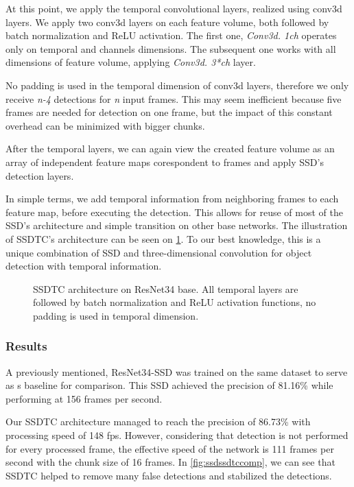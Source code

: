 At this point, we apply the temporal convolutional layers, realized using conv3d layers. We apply two conv3d layers on each feature volume, both followed by batch normalization and ReLU activation.  The first one, \textit{Conv3d. 1\x ch} operates only on temporal and channels dimensions.  The subsequent one works with all dimensions of feature volume, applying \textit{Conv3d. 3*ch} layer. 

No padding is used in the temporal dimension of conv3d layers, therefore we only receive \textit{n-4} detections for \textit{n} input frames. This may seem inefficient because five frames are needed for detection on one frame, but the impact of this constant overhead can be minimized with bigger chunks. 

After the temporal layers, we can again view the created feature volume as an array of independent feature maps corespondent to frames and apply SSD's detection layers. 

In simple terms, we add temporal information from neighboring frames to each feature map, before executing the detection. This allows for reuse of most of the SSD's architecture and simple transition on other base networks. The illustration of SSDTC's architecture can be seen on \cref{fig:ssdtc}. To our best knowledge, this is a unique combination of SSD and three-dimensional convolution for object detection with temporal information.

\begin{figure}
    \centering
    \ssdtc
    \caption[Single Shot Detector with Temporal Convolution (SSDTC)]{SSDTC architecture on ResNet34 base. All temporal layers are followed by batch normalization and ReLU activation functions, no padding is used in temporal dimension.}
    \label{fig:ssdtc}
\end{figure}


\subsubsection{Results}
A previously mentioned, ResNet34-SSD was trained on the same dataset to serve as s baseline for comparison. This SSD achieved the precision of 81.16\% while performing at 156 frames per second. 

Our SSDTC architecture managed to reach the precision of 86.73\% with processing speed of 148 fps. However, considering that detection is not performed for every processed frame, the effective speed of the network is 111 frames per second with the chunk size of 16 frames. In \cref{fig:ssdssdtccomp}, we can see that SSDTC helped to remove many false detections and stabilized the detections.

